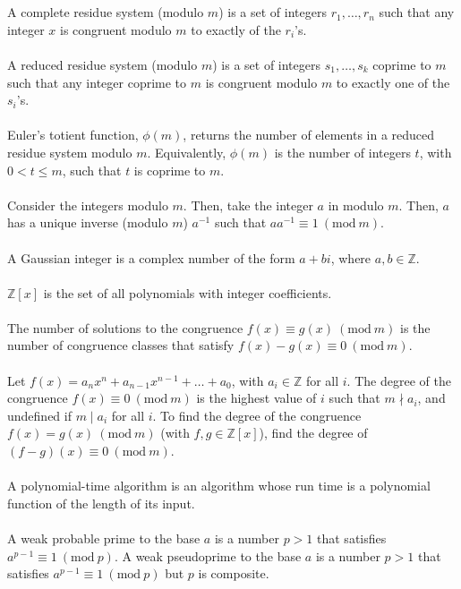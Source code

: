 \documentclass[12pt]{article}
\theoremstyle{definition}
\theoremstyle{named}
\newcommand{\Mod}[1]{\ (\mathrm{mod}\ #1)}
\begin{document}
\\
\\
A complete residue system (modulo $m$) is a set of integers $r_1,\dots,r_n$ such that any integer $x$ is congruent modulo $m$ to exactly of the $r_i$'s. 
\\
\\
A reduced residue system (modulo $m$) is a set of integers $s_1,\dots,s_k$ coprime to $m$ such that any integer coprime to $m$ is congruent modulo $m$ to exactly one of the $s_i$'s. 
\\
\\
Euler's totient function, $\phi(m)$, returns the number of elements in a reduced residue system modulo $m$. Equivalently, $\phi(m)$ is the number of integers $t$, with $0 < t \leq m$, such that $t$ is coprime to $m$. 
\\
\\
Consider the integers modulo $m$. Then, take the integer $a$ in modulo $m$. Then, $a$ has a unique inverse (modulo $m$) $a^{-1}$ such that $aa^{-1} \equiv 1 \Mod{m}$. 
\\
\\
A Gaussian integer is a complex number of the form $a + bi$, where $a,b \in \mathbb{Z}$. 
\\
\\
$\mathbb{Z}[x]$ is the set of all polynomials with integer coefficients.
\\
\\
The number of solutions to the congruence $f(x) \equiv g(x) \Mod{m}$ is the number of congruence classes that satisfy $f(x) - g(x) \equiv 0 \Mod{m}$. 
\\
\\
Let $f(x) = a_nx^n + a_{n-1}x^{n-1} + \dots + a_0$, with $a_i \in \mathbb{Z}$ for all $i$. The degree of the congruence $f(x) \equiv 0 \Mod{m}$ is the highest value of $i$ such that $m \nmid a_i$, and undefined if $m \mid a_i$ for all $i$. To find the degree of the congruence $f(x) = g(x) \Mod{m}$ (with $f,g \in \mathbb{Z}[x]$), find the degree of $(f-g)(x) \equiv 0 \Mod{m}$. 
\\
\\
A polynomial-time algorithm is an algorithm whose run time is a polynomial function of the length of its input.
\\
\\
A weak probable prime to the base $a$ is a number $p>1$ that satisfies $a^{p-1} \equiv 1 \Mod{p}$. A weak pseudoprime to the base $a$ is a number $p>1$ that satisfies $a^{p-1} \equiv 1 \Mod{p}$ but $p$ is composite. 
\end{document}
